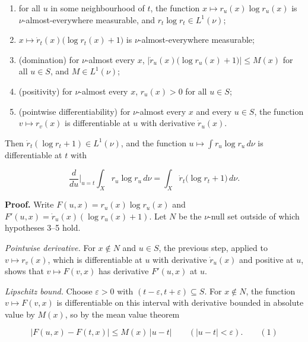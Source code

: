 \documentclass[11pt,a4paper]{article}
\begin{document}
\begin{enumerate}


\item for all \(u\) in some neighbourhood of \(t\), the function \(x\mapsto r_u(x)\log r_u(x)\) is \(\nu\)-almost-everywhere measurable, and \(r_t\log r_t\in L^1(\nu)\);

\item \(x\mapsto\dot r_t(x)\bigl(\log r_t(x)+1\bigr)\) is \(\nu\)-almost-everywhere measurable;

\item (domination) for \(\nu\)-almost every \(x\), \(\bigl|\dot r_u(x)\bigl(\log r_u(x)+1\bigr)\bigr|\le M(x)\) for all \(u\in S\), and \(M\in L^1(\nu)\);

\item (positivity) for \(\nu\)-almost every \(x\), \(r_u(x)>0\) for all \(u\in S\);

\item (pointwise differentiability) for \(\nu\)-almost every \(x\) and every \(u\in S\), the function \(v\mapsto r_v(x)\) is differentiable at \(u\) with derivative \(\dot r_u(x)\).

\end{enumerate}



Then \(\dot r_t(\log r_t+1)\in L^1(\nu)\), and the function \(u\mapsto\int r_u\log r_u\,d\nu\) is differentiable at \(t\) with


\[\frac{d}{du}\Big|_{u=t}\int_Xr_u\log r_u\,d\nu=\int_X\dot r_t\bigl(\log r_t+1\bigr)\,d\nu.\]


\textbf{Proof.} Write \(F(u,x)=r_u(x)\log r_u(x)\) and \(F'(u,x)=\dot r_u(x)(\log r_u(x)+1)\). Let \(N\) be the \(\nu\)-null set outside of which hypotheses 3–5 hold.




\emph{Pointwise derivative.} For \(x\notin N\) and \(u\in S\), the previous step, applied to \(v\mapsto r_v(x)\), which is differentiable at \(u\) with derivative \(\dot r_u(x)\) and positive at \(u\), shows that \(v\mapsto F(v,x)\) has derivative \(F'(u,x)\) at \(u\).




\emph{Lipschitz bound.} Choose \(\varepsilon>0\) with \((t-\varepsilon,t+\varepsilon)\subseteq S\). For \(x\notin N\), the function \(v\mapsto F(v,x)\) is differentiable on this interval with derivative bounded in absolute value by \(M(x)\), so by the mean value theorem


\[|F(u,x)-F(t,x)|\le M(x)\,|u-t|\qquad(|u-t|<\varepsilon).\qquad(1)\]
\end{document}
